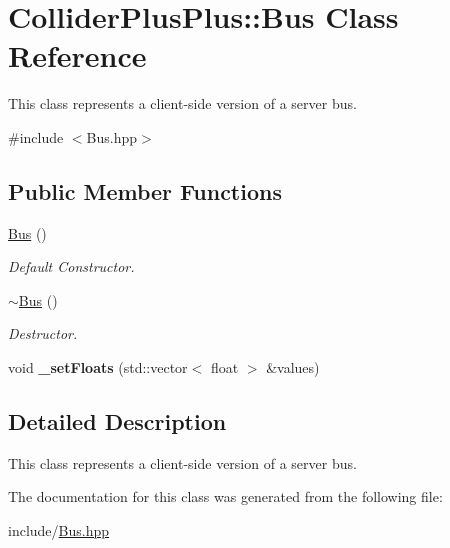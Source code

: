 \hypertarget{classColliderPlusPlus_1_1Bus}{\section{Collider\-Plus\-Plus\-:\-:Bus Class Reference}
\label{classColliderPlusPlus_1_1Bus}
}


This class represents a client-\/side version of a server bus.  




{\ttfamily \#include $<$Bus.\-hpp$>$}

\subsection*{Public Member Functions}
\begin{DoxyCompactItemize}
\item 
\hypertarget{classColliderPlusPlus_1_1Bus_a2573707ab0adc378f8c4db656209c289}{\hyperlink{classColliderPlusPlus_1_1Bus_a2573707ab0adc378f8c4db656209c289}{Bus} ()}\label{classColliderPlusPlus_1_1Bus_a2573707ab0adc378f8c4db656209c289}

\begin{DoxyCompactList}\small\item\em Default Constructor. \end{DoxyCompactList}\item 
\hypertarget{classColliderPlusPlus_1_1Bus_a3940fb5fc3ab9d5b84c35fc1c9bd7ebe}{\hyperlink{classColliderPlusPlus_1_1Bus_a3940fb5fc3ab9d5b84c35fc1c9bd7ebe}{$\sim$\-Bus} ()}\label{classColliderPlusPlus_1_1Bus_a3940fb5fc3ab9d5b84c35fc1c9bd7ebe}

\begin{DoxyCompactList}\small\item\em Destructor. \end{DoxyCompactList}\item 
\hypertarget{classColliderPlusPlus_1_1Bus_a8cd49b944ff03a2bef2b84889b33d24c}{void {\bfseries \-\_\-set\-Floats} (std\-::vector$<$ float $>$ \&values)}\label{classColliderPlusPlus_1_1Bus_a8cd49b944ff03a2bef2b84889b33d24c}

\end{DoxyCompactItemize}


\subsection{Detailed Description}
This class represents a client-\/side version of a server bus. 

The documentation for this class was generated from the following file\-:\begin{DoxyCompactItemize}
\item 
include/\hyperlink{Bus_8hpp}{Bus.\-hpp}\end{DoxyCompactItemize}
